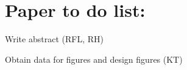 \section*{Paper to do list:}

\begin{todolist}
    
    \item[\done] Write abstract (RFL, RH)
    \item Obtain data for figures and design figures (KT)
    
    

\end{todolist}


